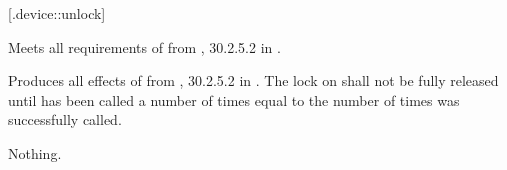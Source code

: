  [\iotwod.device::unlock] {}

%
%
\begin{itemdecl}
\end{itemdecl}
\begin{itemdescr}
	\pnum
	\requires
	Meets all requirements of  from , 
	30.2.5.2 in \CppXIV.
	
	\pnum
	\effects
	Produces all effects of  from , 
	30.2.5.2 in \CppXIV. The lock on  shall not be fully released 
	until  has been called a number of times equal to the 
	number of times  was successfully called.
	
	\pnum
	\throws
	Nothing.
\end{itemdescr}
